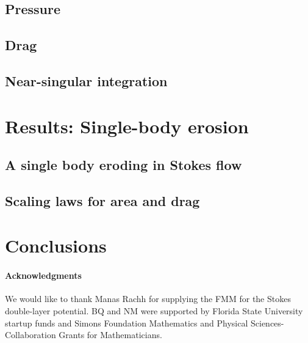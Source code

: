 \documentclass[preprint, 10pt]{elsarticle}
\begin{document}
\subsection{Pressure}
\label{sec:pressure}

\subsection{Drag}
\label{sec:drag}

\subsection{Near-singular integration}
\label{sec:NSI}

\section{Results: Single-body erosion}
\label{s:SingleResults}

\subsection{A single body eroding in Stokes flow}

\subsection{Scaling laws for area and drag}
\label{sec:scaling}


\section{Conclusions\label{s:conclusions}}


\paragraph{\bf Acknowledgments} We would like to thank Manas Rachh for
supplying the FMM for the Stokes double-layer potential. BQ and NM were
supported by Florida State University startup funds and Simons
Foundation Mathematics and Physical Sciences-Collaboration Grants for
Mathematicians.

 

\end{document}
